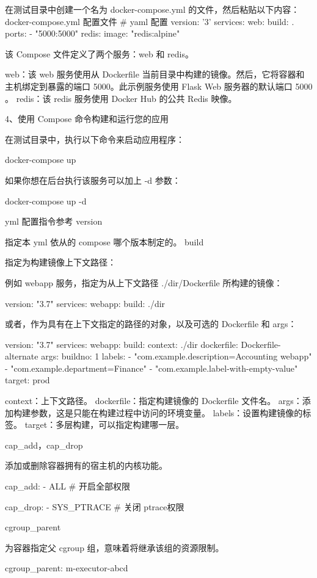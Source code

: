 在测试目录中创建一个名为 docker-compose.yml 的文件，然后粘贴以下内容：
docker-compose.yml 配置文件
# yaml 配置
version: '3'
services:
  web:
    build: .
    ports:
     - "5000:5000"
  redis:
    image: "redis:alpine"

该 Compose 文件定义了两个服务：web 和 redis。

    web：该 web 服务使用从 Dockerfile 当前目录中构建的镜像。然后，它将容器和主机绑定到暴露的端口 5000。此示例服务使用 Flask Web 服务器的默认端口 5000 。
    redis：该 redis 服务使用 Docker Hub 的公共 Redis 映像。

4、使用 Compose 命令构建和运行您的应用

在测试目录中，执行以下命令来启动应用程序：

docker-compose up

如果你想在后台执行该服务可以加上 -d 参数：

docker-compose up -d

yml 配置指令参考
version

指定本 yml 依从的 compose 哪个版本制定的。
build

指定为构建镜像上下文路径：

例如 webapp 服务，指定为从上下文路径 ./dir/Dockerfile 所构建的镜像：

version: "3.7"
services:
  webapp:
    build: ./dir

或者，作为具有在上下文指定的路径的对象，以及可选的 Dockerfile 和 args：

version: "3.7"
services:
  webapp:
    build:
      context: ./dir
      dockerfile: Dockerfile-alternate
      args:
        buildno: 1
      labels:
        - "com.example.description=Accounting webapp"
        - "com.example.department=Finance"
        - "com.example.label-with-empty-value"
      target: prod

    context：上下文路径。
    dockerfile：指定构建镜像的 Dockerfile 文件名。
    args：添加构建参数，这是只能在构建过程中访问的环境变量。
    labels：设置构建镜像的标签。
    target：多层构建，可以指定构建哪一层。

cap_add，cap_drop

添加或删除容器拥有的宿主机的内核功能。

cap_add:
  - ALL # 开启全部权限

cap_drop:
  - SYS_PTRACE # 关闭 ptrace权限

cgroup_parent

为容器指定父 cgroup 组，意味着将继承该组的资源限制。

cgroup_parent: m-executor-abcd

